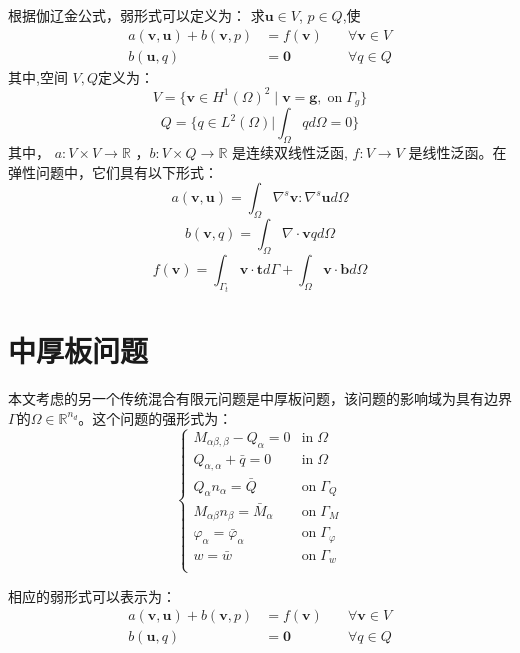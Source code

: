 根据伽辽金公式，弱形式可以定义为：
求$\boldsymbol u \in V$, $p \in Q$,使
\begin{equation}
    \begin{aligned}
        a(\boldsymbol v, \boldsymbol u) + b(\boldsymbol v, p) &= f(\boldsymbol v) \quad &\forall \boldsymbol v \in V \\
        b(\boldsymbol u, q) &= \boldsymbol 0 \quad &\forall q \in Q
    \end{aligned}
\end{equation}
其中,空间 $V, Q$定义为：
\begin{equation}
    V=\{\boldsymbol v \in H^1(\Omega)^2\;\vert\;\boldsymbol v = \boldsymbol g, \; \textrm{on} \; \Gamma_g\}
\end{equation}
\begin{equation}
    Q = \{q \in L^2(\Omega) \vert \int_{\Omega} q d\Omega = 0\}
\end{equation}
其中， $a:V\times V\rightarrow \mathbb R$ ，$b:V\times Q\rightarrow \mathbb R$ 是连续双线性泛函, $f:V\rightarrow V$ 是线性泛函。在弹性问题中，它们具有以下形式：
\begin{equation}
    a(\boldsymbol v, \boldsymbol u) = \int_\Omega \nabla^s \boldsymbol v : \nabla^s \boldsymbol u d\Omega
\end{equation}
\begin{equation}
    b(\boldsymbol v, q) = \int_\Omega \nabla \cdot \boldsymbol v q d\Omega
\end{equation}
\begin{equation}
    f(\boldsymbol v) = \int_{\Gamma_t} \boldsymbol v \cdot \boldsymbol t d\Gamma + \int_{\Omega} \boldsymbol v \cdot \boldsymbol b d\Omega
\end{equation}
\section{中厚板问题}
本文考虑的另一个传统混合有限元问题是中厚板问题，该问题的影响域为具有边界$\Gamma$的$\Omega\in \mathbb R^{n_d}$。这个问题的强形式为：
\begin{equation}\label{strong2}
    \begin{cases}
        M_{\alpha\beta,\beta} - Q_\alpha = 0 & \textrm{in}\; \Omega \\
        Q_{\alpha,\alpha} + \bar q = 0 & \textrm{in}\; \Omega \\    Q_\alpha n_\alpha = \bar Q & \textrm{on}\; \Gamma_Q \\
        M_{\alpha\beta} n_\beta = \bar M_\alpha & \textrm{on}\; \Gamma_M \\
        \varphi_\alpha = \bar \varphi_\alpha & \textrm{on}\; \Gamma_\varphi \\
        w = \bar w & \textrm{on}\; \Gamma_w \\
    \end{cases}
\end{equation}

相应的弱形式可以表示为：
\begin{equation}
    \begin{aligned}
        a(\boldsymbol v, \boldsymbol u) + b(\boldsymbol v, p) &= f(\boldsymbol v) \quad &\forall \boldsymbol v \in V \\
        b(\boldsymbol u, q) &= \boldsymbol 0 \quad &\forall q \in Q
    \end{aligned}
\end{equation}
